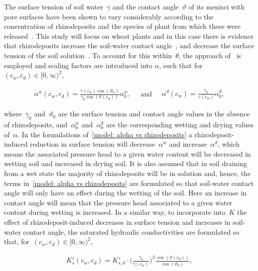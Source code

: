 \documentclass[11pt,a4paper]{article}
\numberwithin{equation}{section}
\begin{document}
The surface tension of soil water~$\gamma$ and the contact angle~$\vartheta$ of its menisci with pore surfaces have been shown to vary considerably according to the concentration of rhizodeposits and the species of plant from which these were released~\citep{ahmed2016drying, naveed2018rhizosphere, naveed2019surface}. This study will focus on wheat plants and in this case there is evidence that rhizodeposits increase the soil-water contact angle~\citep{zickenrott2016efficient}, and decrease the surface tension of the soil solution~\citep{read2003plant}. To account for this within~$\theta$, the approach of~\cite{karagunduz2001influence} is employed and scaling factors are introduced into $\alpha$, such that for~$(c_w,c_d)\in[0,\infty)^2$, 
\begin{linenomath*}
	\begin{equation}\label{model: alpha vs rhizodeposits}
		\begin{aligned}
			\alpha^w(c_w,c_d) = \frac{\gamma(c_w)\cos(\vartheta_0)}{\gamma_0\cos(\vartheta(c_d))}\alpha_0^w,
		\end{aligned}
		\quad
		\text{and}
		\quad
		\begin{aligned}
			\alpha^d(c_w) = 
			\frac{\gamma_0}{\gamma(c_w)}\alpha_0^d,			 
		\end{aligned}
	\end{equation}
\end{linenomath*}
where~$\gamma_0$ and~$\vartheta_0$ are the surface tension and contact angle values in the absence of rhizodeposits, and~$\alpha_0^w$ and~$\alpha_0^d$ are the corresponding wetting and drying values of~$\alpha$. In the formulations of~\eqref{model: alpha vs rhizodeposits} a rhizodeposit-induced reduction in surface tension will decrease~$\alpha^w$ and increase~$\alpha^d$, which means the associated pressure head to a given water content will be decreased in wetting soil and increased in drying soil. It is also assumed that in soil draining from a wet state the majority of rhizodeposits will be in solution and, hence, the terms in~\eqref{model: alpha vs rhizodeposits} are formulated so that soil-water contact angle will only have an effect during the wetting of the soil. Here an increase in contact angle will mean that the pressure head associated to a given water content during wetting is increased. In a similar way, to incorporate into~$K$ the effect of rhizodeposit-induced decreases in surface tension and increases in soil-water contact angle, the saturated hydraulic conductivities are formulated so that, for~$(c_w,c_d)\in[0,\infty)^2$,
\begin{linenomath*}
	\begin{equation}\label{model: Ks vs rhizodeposits}
		\begin{aligned}
			K_s^z(c_w,c_d) = K_{s,0}^z\cdot\Big(\frac{\gamma_0}{\gamma(c_w)}\Big)^\beta\frac{\cos(\vartheta(c_d))}{\cos(\vartheta_0)},
		\end{aligned}
	\end{equation}
\end{linenomath*}
\end{document}
